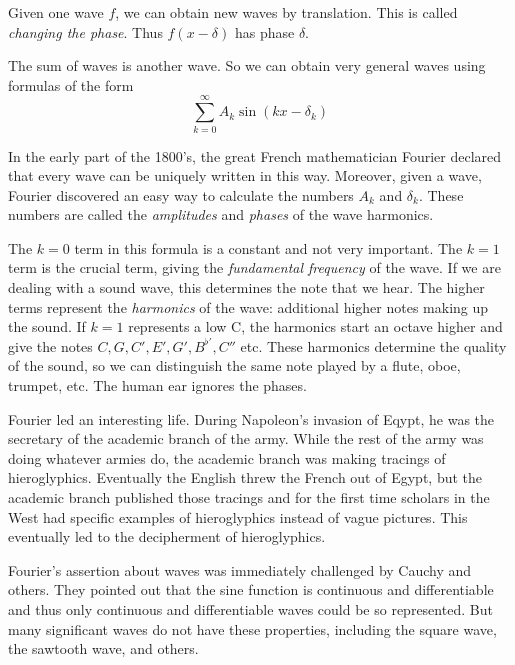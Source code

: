 \documentclass[11pt, oneside]{article}   	%
\begin{document}
Given one wave $f$, we can obtain new waves by translation. This is called {\em changing the phase}.
Thus $f(x - \delta)$ has phase $\delta$. 

The sum of  waves is another wave. So we can obtain very general waves using formulas of the form
\[\sum_{k = 0}^\infty A_k \sin(kx - \delta_k)\]

In the early part of the 1800's, the great French mathematician Fourier declared that every wave can be uniquely written in this way. Moreover, given a wave, Fourier discovered an easy way to calculate the numbers $A_k$ and $\delta_k$. These numbers are called the {\em amplitudes} and {\em phases} of the wave harmonics.


The $k = 0$ term in this formula is a constant and not very important. The $k = 1$ term is the crucial term, giving the {\em fundamental frequency} of the wave. If we are dealing with a sound wave, this determines the note that we hear. The higher terms represent the {\em harmonics} of the wave: additional higher notes making up the sound.  If $k = 1$ represents a low C, the harmonics start an octave higher and give the notes $C, G, C', E', G', B^{\flat'}, C''$ etc. These harmonics determine the quality of the sound, so we can distinguish the same note played by a flute, oboe, trumpet, etc. The human ear ignores the phases.

Fourier led an interesting life. During Napoleon's invasion of Eqypt, he was the secretary of the academic branch of the army. While the rest of the army was doing whatever armies do, the academic branch was making tracings of hieroglyphics. Eventually the English threw the French out of Egypt, but the academic branch published those tracings and for the first time scholars in the West had specific examples of hieroglyphics instead of vague pictures. This eventually led to the decipherment of hieroglyphics.

Fourier's assertion about waves was immediately challenged by Cauchy and others. They pointed out that the sine function is continuous and differentiable and thus only continuous and differentiable waves could be so represented. But many significant waves do not have these properties, including the square wave, the sawtooth wave, and others.  
\end{document}
